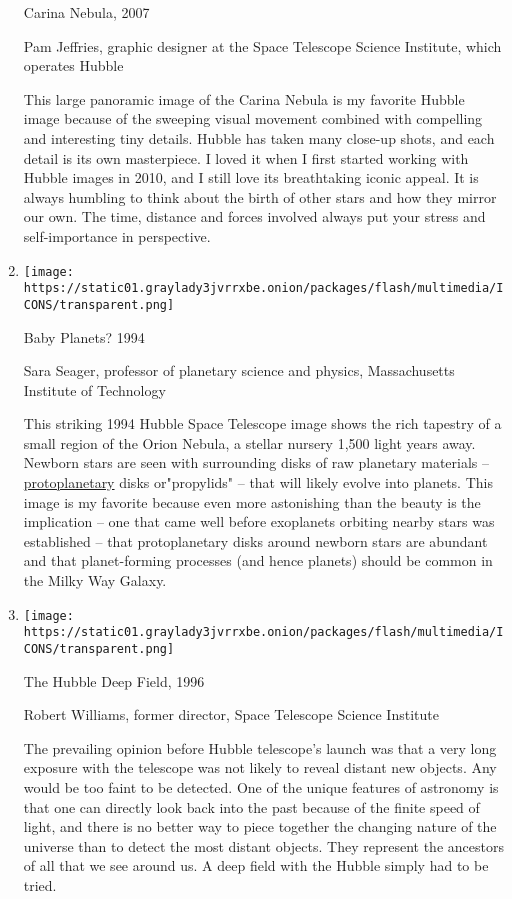 \begin{enumerate}
  Carina Nebula, 2007

  Pam Jeffries, graphic designer at the Space Telescope Science
  Institute, which operates Hubble

  This large panoramic image of the Carina Nebula is my favorite Hubble
  image because of the sweeping visual movement combined with compelling
  and interesting tiny details. Hubble has taken many close-up shots,
  and each detail is its own masterpiece. I loved it when I first
  started working with Hubble images in 2010, and I still love its
  breathtaking iconic appeal. It is always humbling to think about the
  birth of other stars and how they mirror our own. The time, distance
  and forces involved always put your stress and self-importance in
  perspective.
\item
  \texttt{[image: https://static01.graylady3jvrrxbe.onion/packages/flash/multimedia/ICONS/transparent.png]}

  Baby Planets? 1994

  Sara Seager, professor of planetary science and physics, Massachusetts
  Institute of Technology

  This striking 1994 Hubble Space Telescope image shows the rich
  tapestry of a small region of the Orion Nebula, a stellar nursery
  1,500 light years away. Newborn stars are seen with surrounding disks
  of raw planetary materials --
  \href{http://www.nytimes3xbfgragh.onion/1997/08/12/science/big-gas-disk-may-form-a-new-planet-system.htm}{protoplanetary}
  disks or"propylids" -- that will likely evolve into planets. This
  image is my favorite because even more astonishing than the beauty is
  the implication -- one that came well before exoplanets orbiting
  nearby stars was established -- that protoplanetary disks around
  newborn stars are abundant and that planet-forming processes (and
  hence planets) should be common in the Milky Way Galaxy.
\item
  \texttt{[image: https://static01.graylady3jvrrxbe.onion/packages/flash/multimedia/ICONS/transparent.png]}

  The Hubble Deep Field, 1996

  Robert Williams, former director, Space Telescope Science Institute

  The prevailing opinion before Hubble telescope's launch was that a
  very long exposure with the telescope was not likely to reveal distant
  new objects. Any would be too faint to be detected. One of the unique
  features of astronomy is that one can directly look back into the past
  because of the finite speed of light, and there is no better way to
  piece together the changing nature of the universe than to detect the
  most distant objects. They represent the ancestors of all that we see
  around us. A deep field with the Hubble simply had to be tried.


\end{enumerate}
